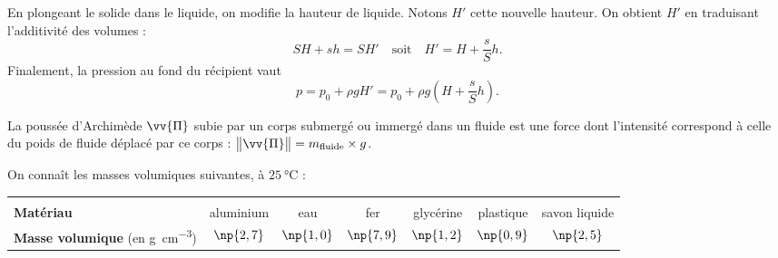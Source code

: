 
\begin{corrige}
En plongeant le solide dans le liquide, on modifie la hauteur de liquide. Notons $H'$ cette nouvelle hauteur. On obtient $H'$ en traduisant l'additivité des volumes : 
\[
SH+sh=SH'
\quad\text{soit}\quad
H'=H+\frac{s}{S}h.
\]
Finalement, la pression au fond du récipient vaut 
\[
p=p_0+\rho g H'=p_0+\rho g\left(H+\frac{s}{S}h\right).
\]
\end{corrige}


\finEntrainement









\hauteurLargeurCadreReponse		{8mm}{2cm}
\initialisationEntrainement

La poussée d'Archimède $\vv{\Pi}$ subie par un corps submergé ou immergé dans un fluide est une force dont l'intensité correspond à celle du poids de fluide déplacé par ce corps : $\big \| \vv{\Pi}\big \|=m_\mathrm{fluide} \times g$.

On connaît les masses volumiques suivantes, à $\SI{25}{\celsius}$ :
\begin{center}
\begin{tabular}{ |l|c|c|c|c|c|c|} 
			\hline&&&&&&\\[-3.5mm]
\textbf{Matériau} & aluminium & eau&  fer & glycérine & plastique & savon liquide\\
\textbf{Masse volumique} (en \si{g.cm^{-3}}) & $\np{2,7}$ & $\np{1,0}$ & $\np{7,9}$ & $\np{1,2}$ & $\np{0,9}$ & $\np{2,5}$\\[1mm]
\hline
\end{tabular}
\end{center}



